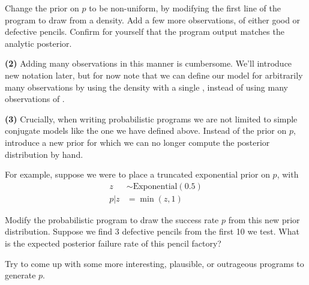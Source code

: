 \documentclass[11pt,reqno]{amsart}
\newif\ifanswers
\newcommand{\+}[1]{\ensuremath{{\mathbf{#1}}}}
\begin{document}
\ifanswers
\begin{quote}
{\bf Answer:}
For $a=b=1$, $N=1$, $K=0$ the posterior should have: 
\begin{align} 
\mathbb{E}[p] &\approx 0.3333 &
\mathbb{V}[p] &\approx 0.0556.
\end{align}
\end{quote}
\fi

Change the prior on $p$ to be non-uniform, by modifying the first line of the program to draw from a  density. 
Add a few more observations, of either good or defective pencils.
Confirm for yourself that the program output matches the analytic posterior.

{\bf (2)} Adding many observations in this manner is cumbersome.
We'll introduce new notation later, but for now note that we can define our model for arbitrarily many observations by using the  density with a single , instead of using many observations of .

\ifanswers
\begin{quote}
{\bf Example answer:}
\begin{code}{}{}
[assume p (beta 5 5)]
[observe (binomial p 10) 7]
[predict p]
\end{code}
\end{quote}
\fi

{\bf (3)} 
Crucially, when writing probabilistic programs we are not limited to simple conjugate models like the one we have defined above.
Instead of the  prior on $p$, introduce a new prior for which we can no longer compute the posterior distribution by hand.

For example, suppose we were to place a truncated exponential prior on $p$, with
\begin{align}
z &\sim \mathrm{Exponential}(0.5) \\
p|z &= \min(z, 1)
\end{align}

Modify the probabilistic program to draw the success rate $p$ from this new prior distribution. Suppose we find 3 defective pencils from the first 10 we test. What is the expected posterior failure rate of this pencil factory?

\ifanswers
\begin{quote}
{\bf Answer:}
\begin{code}{}{}
[assume z (exponential 0.5)]
[assume p (if (> z 1) 1 z)]
[observe (binomial p 10) 8]
[predict p]
\end{code}
\end{quote}
\fi


Try to come up with some more interesting, plausible, or outrageous programs to generate $p$.




\end{document}
